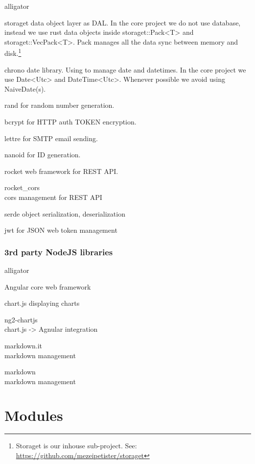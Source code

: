 \documentclass{article}
\begin{document}
\begin{labeling}{alligator}
  \item [storaget] data object layer as DAL. In the core project we do
  not use database, instead we use rust data objects inside
  storaget::Pack<T> and storaget::VecPack<T>. Pack manages all the
  data sync between memory and disk.\footnote{Storaget is our inhouse sub-project. See: \url{https://github.com/mezeipetister/storaget}}
  \item [chrono] date library. Using to manage date and datetimes. In
  the core project we use Date<Utc> and DateTime<Utc>. Whenever possible
  we avoid using NaiveDate(s).
  \item [rand] for random number generation.
  \item [bcrypt] for HTTP auth TOKEN encryption.
  \item [lettre] for SMTP email sending.
  \item [nanoid] for ID generation.
  \item [rocket] web framework for REST API.
  \item [rocket\_cors] \hfill \\ cors management for REST API
  \item [serde] object serialization, deserialization
  \item [jwt] for JSON web token management
\end{labeling}

\subsubsection{3rd party NodeJS libraries}

\begin{labeling}{alligator}
  \item [Angular] core web framework
  \item [chart.js] displaying charts
  \item [ng2-chartjs] \hfill \\ chart.js -> Agnular integration
  \item [markdown.it] \hfill \\ markdown management
  \item [markdown] \hfill \\ markdown management
\end{labeling}

\newpage

\section{Modules}
\end{document}
